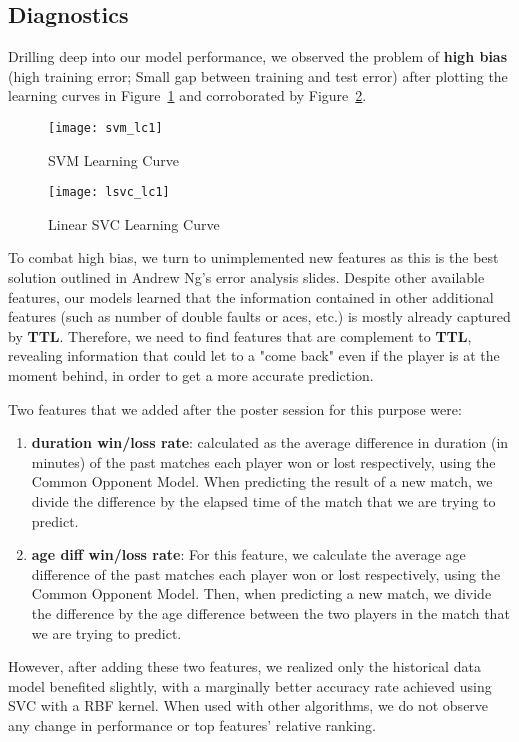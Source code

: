 \documentclass[paper=a4, fontsize=10pt]{scrartcl} %
\numberwithin{equation}{section} %
\numberwithin{figure}{section} %
\numberwithin{table}{section} %
\begin{document}
\subsection{Diagnostics}
Drilling deep into our model performance, we observed the problem of \textbf{high bias} (high training error; Small gap between training and test error) after plotting the learning curves in Figure~\ref{fig:svm} and corroborated by Figure~\ref{fig:lsvc}. 
\begin{figure}[h]
\caption{SVM Learning Curve}
  \label{fig:svm}
  \centering
    \texttt{[image: svm\_lc1]}
\end{figure}

\begin{figure}[h]
\caption{Linear SVC Learning Curve}
  \label{fig:lsvc}
  \centering
    \texttt{[image: lsvc\_lc1]}
\end{figure}

To combat high bias, we turn to unimplemented new features as this is the best solution outlined in Andrew Ng's error analysis slides. Despite other available features, our models learned that the information contained in other additional features (such as number of double faults or aces, etc.) is mostly already captured by \textbf{TTL}.  Therefore, we need to find features that are complement to \textbf{TTL}, revealing information that could let to a "come back" even if the player is at the moment behind, in order to get a more accurate prediction.
 
Two features that we added after the poster session for this purpose were: \begin{enumerate}
\item \textbf{duration win/loss rate}: calculated as the average difference in duration (in minutes) of the past matches each player won or lost respectively, using the Common Opponent Model. When predicting the result of a new match, we divide the difference by the elapsed time of the match that we are trying to predict. 
\item \textbf{age diff win/loss rate}: For this feature, we calculate the average age difference of the past matches each player won or lost respectively, using the Common Opponent Model. Then, when predicting a new match, we divide the difference by the age difference between the two players in the match that we are trying to predict.
\end{enumerate}

However, after adding these two features, we realized only the historical data model benefited slightly, with a marginally better accuracy rate achieved using SVC with a RBF kernel. When used with other algorithms, we do not observe any change in performance or top features' relative ranking. 
\end{document}
